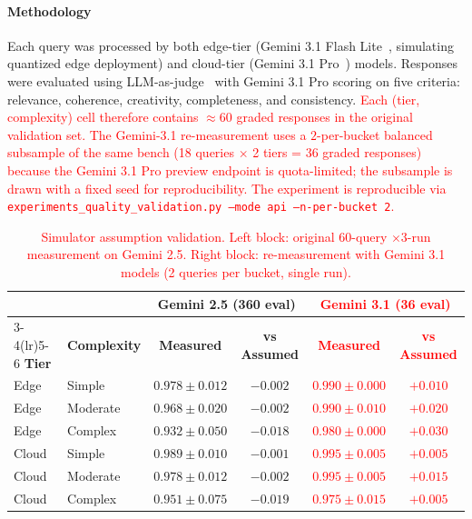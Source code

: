 \documentclass[final,3p,twocolumn,authoryear]{elsarticle}
\newcommand{\rev}[1]{\textcolor{red}{#1}}
\theoremstyle{plain}
\theoremstyle{definition}
\begin{document}
\paragraph{Methodology}
Each query was processed by both edge-tier (Gemini 3.1 Flash Lite~\citep{googledeepmind2026gemini31flashlite}, simulating quantized edge deployment) and cloud-tier (Gemini 3.1 Pro~\citep{googledeepmind2026gemini31pro}) models.
Responses were evaluated using LLM-as-judge~\citep{zheng2023judging} with Gemini 3.1 Pro scoring on five criteria: relevance, coherence, creativity, completeness, and consistency.
\rev{Each (tier, complexity) cell therefore contains $\approx 60$ graded responses in the original validation set. The Gemini-3.1 re-measurement uses a $2$-per-bucket balanced subsample of the same bench (18 queries $\times$ 2 tiers = 36 graded responses) because the Gemini 3.1 Pro preview endpoint is quota-limited; the subsample is drawn with a fixed seed for reproducibility. The experiment is reproducible via \texttt{experiments\_quality\_validation.py --mode api --n-per-bucket 2}.}

\begin{table}[t]
  \centering
  \caption{\rev{Simulator assumption validation. Left block: original $60$-query $\times 3$-run measurement on Gemini 2.5. Right block: re-measurement with Gemini 3.1 models (2 queries per bucket, single run).}}
  \label{tab:quality-validation}
  \small
  \begin{tabular}{llcccc}
    \toprule
    & & \multicolumn{2}{c}{\textbf{Gemini 2.5 (360 eval)}} & \multicolumn{2}{c}{\rev{\textbf{Gemini 3.1 (36 eval)}}} \\
    \cmidrule(lr){3-4}\cmidrule(lr){5-6}
    \textbf{Tier} & \textbf{Complexity} & \textbf{Measured} & \textbf{vs Assumed} & \rev{\textbf{Measured}} & \rev{\textbf{vs Assumed}} \\
    \midrule
    Edge  & Simple   & $0.978 \pm 0.012$ & $-0.002$ & \rev{$0.990 \pm 0.000$} & \rev{$+0.010$} \\
    Edge  & Moderate & $0.968 \pm 0.020$ & $-0.002$ & \rev{$0.990 \pm 0.010$} & \rev{$+0.020$} \\
    Edge  & Complex  & $0.932 \pm 0.050$ & $-0.018$ & \rev{$0.980 \pm 0.000$} & \rev{$+0.030$} \\
    \midrule
    Cloud & Simple   & $0.989 \pm 0.010$ & $-0.001$ & \rev{$0.995 \pm 0.005$} & \rev{$+0.005$} \\
    Cloud & Moderate & $0.978 \pm 0.012$ & $-0.002$ & \rev{$0.995 \pm 0.005$} & \rev{$+0.015$} \\
    Cloud & Complex  & $0.951 \pm 0.075$ & $-0.019$ & \rev{$0.975 \pm 0.015$} & \rev{$+0.005$} \\
    \bottomrule
  \end{tabular}
\end{table}
\end{document}
